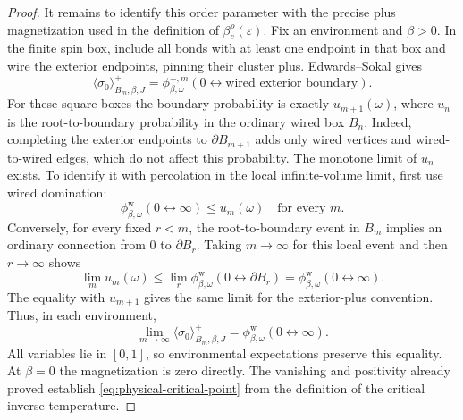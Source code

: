 \begin{proof}
It remains to identify this order parameter with the precise plus
magnetization used in the definition of $\beta_c^\rho(\varepsilon)$.
Fix an environment and $\beta>0$. In the finite spin box, include
all bonds with at least one endpoint in that box and wire the exterior
endpoints, pinning their cluster plus. Edwards--Sokal gives
\[
 \langle\sigma_0\rangle^+_{B_m,\beta,J}
       =\phi^{+,m}_{\beta,\omega}
               (0\leftrightarrow\text{wired exterior boundary}).
\]
For these square boxes the boundary probability is exactly
$u_{m+1}(\omega)$, where $u_n$ is the root-to-boundary probability
in the ordinary wired box $B_n$. Indeed, completing the exterior
endpoints to $\partial B_{m+1}$ adds only wired vertices and
wired-to-wired edges, which do not affect this probability.
The monotone limit of $u_n$ exists. To identify it with percolation
in the local infinite-volume limit, first use wired domination:
\[
 \phi_{\beta,\omega}^{\mathrm w}(0\leftrightarrow\infty)
                         \le u_m(\omega)
 \quad\text{for every }m.
\]
Conversely, for every fixed $r<m$, the root-to-boundary event in
$B_m$ implies an ordinary connection from $0$ to $\partial B_r$.
Taking $m\to\infty$ for this local event and then $r\to\infty$
shows
\[
 \lim_m u_m(\omega)
       \le\lim_r\phi_{\beta,\omega}^{\mathrm w}
                    (0\leftrightarrow\partial B_r)
       =\phi_{\beta,\omega}^{\mathrm w}(0\leftrightarrow\infty).
\]
The equality with $u_{m+1}$ gives the same limit for the exterior-plus
convention. Thus, in each environment,
\begin{equation}
 \lim_{m\to\infty}\langle\sigma_0\rangle^+_{B_m,\beta,J}
       =\phi_{\beta,\omega}^{\mathrm w}(0\leftrightarrow\infty).
 \label{eq:magnetization-percolation}
\end{equation}
All variables lie in $[0,1]$, so environmental expectations preserve
this equality. At $\beta=0$ the magnetization is zero directly.
The vanishing and positivity already proved establish
\eqref{eq:physical-critical-point} from the definition of the
critical inverse temperature.
\end{proof}
